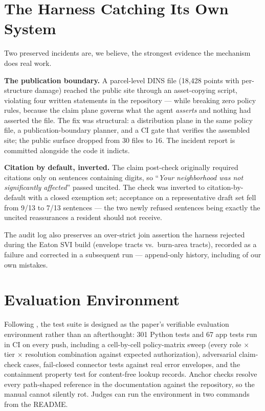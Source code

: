 \documentclass[sigconf,screen]{acmart}
\begin{document}
\section{The Harness Catching Its Own System}
\label{sec:incidents}

Two preserved incidents are, we believe, the strongest evidence the
mechanism does real work.

\textbf{The publication boundary.} A parcel-level DINS file (18{,}428
points with per-structure damage) reached the public site through an
asset-copying script, violating four written statements in the
repository --- while breaking zero policy rules, because the claim plane
governs what the agent \emph{asserts} and nothing had asserted the file.
The fix was structural: a distribution plane in the same policy file,
a publication-boundary planner, and a CI gate that verifies the
assembled site; the public surface dropped from 30 files to 16. The
incident report is committed alongside the code it indicts.

\textbf{Citation by default, inverted.} The claim post-check originally
required citations only on sentences containing digits, so
``\emph{Your neighborhood was not significantly affected}'' passed
uncited. The check was inverted to citation-by-default with a closed
exemption set; acceptance on a representative draft set fell from 9/13
to 7/13 sentences --- the two newly refused sentences being exactly the
uncited reassurances a resident should not receive.

The audit log also preserves an over-strict join assertion the harness
rejected during the Eaton SVI build (envelope tracts vs.\ burn-area
tracts), recorded as a failure and corrected in a subsequent run ---
append-only history, including of our own mistakes.

\section{Evaluation Environment}

Following \citet{yang2026accountable}, the test suite is designed as the
paper's verifiable evaluation environment rather than an afterthought:
301 Python tests and 67 app tests run in CI on every push, including a
cell-by-cell policy-matrix sweep (every role $\times$ tier $\times$
resolution combination against expected authorization), adversarial
claim-check cases, fail-closed connector tests against real error
envelopes, and the containment property test for content-free lookup
records. Anchor checks resolve every path-shaped reference in the
documentation against the repository, so the manual cannot silently rot.
Judges can run the environment in two commands from the README.
\end{document}
